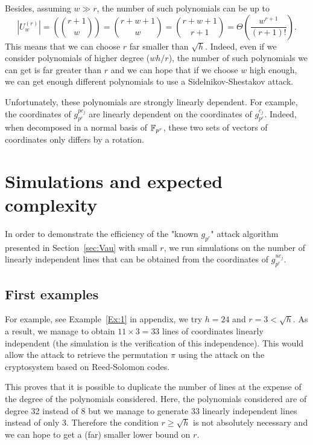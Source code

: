 \documentclass[a4paper]{article}
\begin{document}
Besides, assuming $w \gg r$, the number of such polynomials can be up to
$$ | U_w^{(r)} | = \left( \binom{r+1}{w} \right) = \binom{r+w+1}{w} = \binom{r+w+1}{r+1} = \Theta\left(\frac{w^{r+1}}{(r+1)!}\right) .$$
This means that we can choose $r$ far smaller than $\sqrt{h}$. Indeed, even if we consider polynomials of higher degree ($wh/r$), the number of such polynomials we can get is far greater than $r$ and we can hope that if we choose $w$ high enough, we can get enough different polynomials to use a Sidelnikov-Shestakov attack.


Unfortunately, these polynomials are strongly linearly dependent.
For example, the coordinates of $g_{p^r}^{p c_j}$ are linearly dependent on the coordinates of $g_{p^r}^{c_j}$. Indeed, when decomposed in a normal basis of $\mathbb{F}_{p^r}$, these two sets of vectors of coordinates only differs by a rotation.



\section{Simulations and expected complexity}
\label{sec:Simul}


In order to demonstrate the efficiency of the "known $g_{p^r}$" attack algorithm presented in Section~\ref{sec:Vau} with small $r$, we run simulations on the number of linearly independent lines that can be obtained from the coordinates of $g_{p^r}^{uc_j}$.


\subsection{First examples}

For example, see Example~\ref{Ex:1} in appendix, we try $h = 24$ and $r = 3 < \sqrt{h}$. As a result, we manage to obtain $11 \times 3 = 33$ lines of coordinates linearly independent (the simulation is the verification of this independence). This would allow the attack to retrieve the permutation $\pi$ using the attack on the cryptosystem based on Reed-Solomon codes.

This proves that it is possible to duplicate the number of lines at the expense of the degree of the polynomials considered. Here, the polynomials considered are of degree 32 instead of 8 but we manage to generate 33 linearly independent lines instead of only 3. Therefore the condition $r \geq \sqrt{h}$ is not absolutely necessary and we can hope to get a (far) smaller lower bound on $r$.\\
\end{document}
